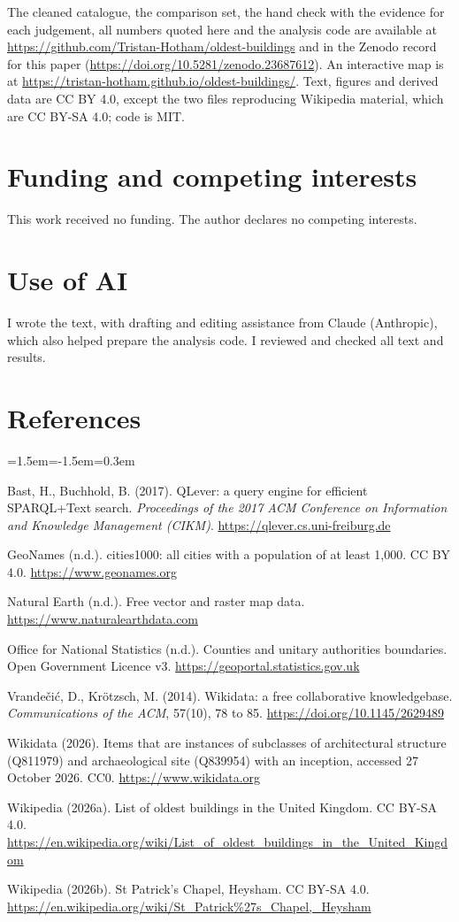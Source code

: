 \documentclass[11pt,a4paper]{article}
\begin{document}
The cleaned catalogue, the comparison set, the hand check with the evidence for each judgement, all numbers quoted here and the analysis code are available at \url{https://github.com/Tristan-Hotham/oldest-buildings} and in the Zenodo record for this paper (\url{https://doi.org/10.5281/zenodo.23687612}). An interactive map is at \url{https://tristan-hotham.github.io/oldest-buildings/}. Text, figures and derived data are CC BY 4.0, except the two files reproducing Wikipedia material, which are CC BY-SA 4.0; code is MIT.

\section*{Funding and competing interests}

This work received no funding. The author declares no competing interests.

\section*{Use of AI}

I wrote the text, with drafting and editing assistance from Claude (Anthropic), which also helped prepare the analysis code. I reviewed and checked all text and results.

\section*{References}
\begin{list}{}{\leftmargin=1.5em\itemindent=-1.5em\itemsep=0.3em\parsep=0pt}\small
\item Bast, H., Buchhold, B. (2017). QLever: a query engine for efficient SPARQL+Text search. \emph{Proceedings of the 2017 ACM Conference on Information and Knowledge Management (CIKM)}. \url{https://qlever.cs.uni-freiburg.de}
\item GeoNames (n.d.). cities1000: all cities with a population of at least 1,000. CC BY 4.0. \url{https://www.geonames.org}
\item Natural Earth (n.d.). Free vector and raster map data. \url{https://www.naturalearthdata.com}
\item Office for National Statistics (n.d.). Counties and unitary authorities boundaries. Open Government Licence v3. \url{https://geoportal.statistics.gov.uk}
\item Vrande\v{c}i\'c, D., Kr\"otzsch, M. (2014). Wikidata: a free collaborative knowledgebase. \emph{Communications of the ACM}, 57(10), 78 to 85. \url{https://doi.org/10.1145/2629489}
\item Wikidata (2026). Items that are instances of subclasses of architectural structure (Q811979) and archaeological site (Q839954) with an inception, accessed 27 October 2026. CC0. \url{https://www.wikidata.org}
\item Wikipedia (2026a). List of oldest buildings in the United Kingdom. CC BY-SA 4.0. \url{https://en.wikipedia.org/wiki/List_of_oldest_buildings_in_the_United_Kingdom}
\item Wikipedia (2026b). St Patrick's Chapel, Heysham. CC BY-SA 4.0. \url{https://en.wikipedia.org/wiki/St_Patrick\%27s_Chapel,_Heysham}
\end{list}
\end{document}
